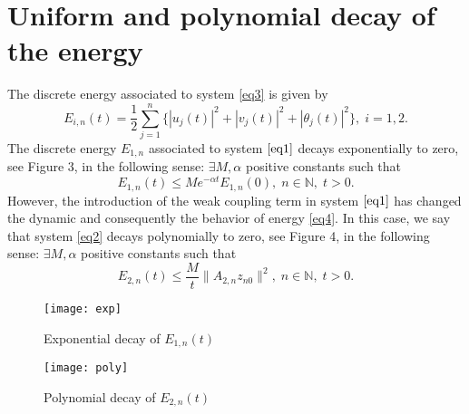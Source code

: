 \documentclass [reqno]{amsart}
\begin{document}
\section*{\bf Uniform and polynomial decay of the energy}
The discrete energy associated to system \eqref{eq3} is given by
\begin{equation}
\label{eq4}
\tag{4}
E_{i,n}(t)=\frac{1}{2}\sum_{j=1}^n\Big\{|u_j(t)|^{2}+|v_j(t)|^{2}+|\theta_j(t)|^{2}\Big\},\;i=1,2.
\end{equation}
The discrete energy $E_{1,n}$ associated to system $\eqref{eq1}$ decays exponentially to zero, see Figure 3, in the following sense: $\exists M,\alpha$ positive constants such that
\[
E_{1,n}(t)\leqslant Me^{-\alpha t}E_{1,n}(0),\;n\in\mathbb{N},\;t>0.
\]
However, the introduction of the weak coupling term in system $\eqref{eq1}$ has changed the dynamic and consequently the behavior of energy \eqref{eq4}. In this case, we say that system \eqref{eq2} decays polynomially to zero, see Figure 4, in the following sense: $\exists M,\alpha$ positive constants such that
\[
E_{2,n}(t)\leqslant \frac{M}{t}\|A_{2,n}z_{n0}\|^2,\;n\in\mathbb{N},\;t>0.
\]
\begin{figure}[H]
\begin{center}
\texttt{[image: exp]}
\caption{Exponential decay of $E_{1,n}(t)$}
\end{center}
\end{figure}
\begin{figure}[H]
\begin{center}
\texttt{[image: poly]}
\caption{Polynomial decay of $E_{2,n}(t)$}
\end{center}
\end{figure}
\end{document}
